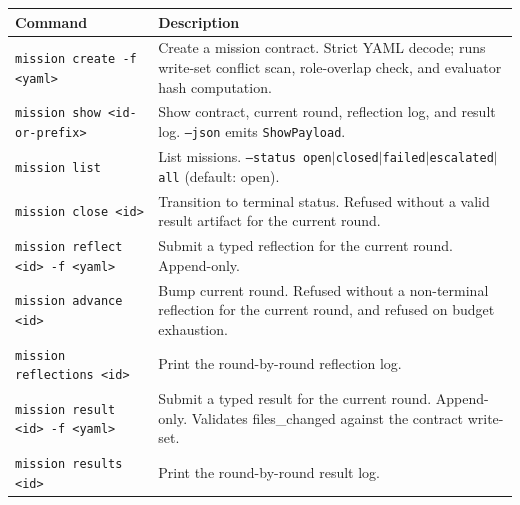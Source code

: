 \documentclass[a4paper,10pt]{article}
\newcommand{\cmd}[1]{\texttt{#1}}
\begin{document}
\begin{center}
\begin{tabular}{@{}lp{6.5cm}@{}}
\toprule
\textbf{Command} & \textbf{Description} \\
\midrule
\cmd{mission create -f <yaml>}      & Create a mission contract.
                                       Strict YAML decode; runs
                                       write-set conflict scan,
                                       role-overlap check, and
                                       evaluator hash computation. \\
\cmd{mission show <id-or-prefix>}   & Show contract, current round,
                                       reflection log, and result
                                       log.  \cmd{--json} emits
                                       \texttt{ShowPayload}. \\
\cmd{mission list}                  & List missions.  \cmd{--status
                                       open$|$closed$|$failed$|$escalated$|$all}
                                       (default: open). \\
\cmd{mission close <id>}            & Transition to terminal status.
                                       Refused without a valid
                                       result artifact for the
                                       current round. \\
\cmd{mission reflect <id> -f <yaml>} & Submit a typed reflection
                                       for the current round.
                                       Append-only. \\
\cmd{mission advance <id>}          & Bump current round.  Refused
                                       without a non-terminal
                                       reflection for the current
                                       round, and refused on budget
                                       exhaustion. \\
\cmd{mission reflections <id>}      & Print the round-by-round
                                       reflection log. \\
\cmd{mission result <id> -f <yaml>}  & Submit a typed result for the
                                       current round.  Append-only.
                                       Validates files\_changed
                                       against the contract
                                       write-set. \\
\cmd{mission results <id>}          & Print the round-by-round
                                       result log. \\

\end{tabular}
\end{center}
\end{document}
